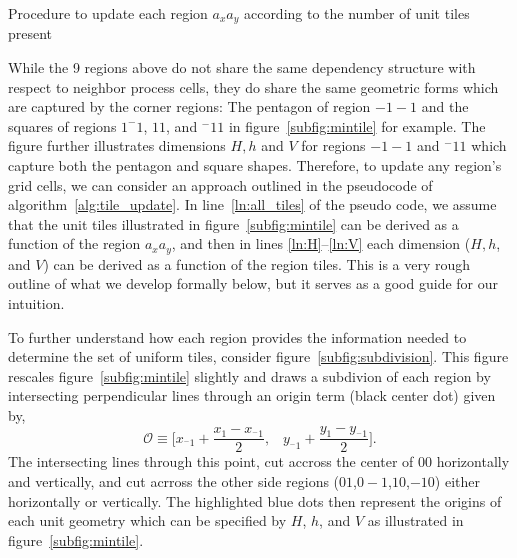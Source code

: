 \begin{algorithm}[h]
  \setcounter{AlgoLine}{0}
  \caption{Procedure to update each region $a_xa_y$ according to the number of unit tiles present}
  \label{alg:tile_update}
\end{algorithm}


While the 9 regions above do not share the same dependency structure with respect to neighbor process cells,
they do share the same geometric forms which are captured by the corner regions: The pentagon of region
$-1-1$ and the squares of regions $1^-1$, $11$, and $^-11$ in figure~\ref{subfig:mintile} for example.
  The figure further illustrates dimensions
$H,h$ and $V$ for regions $-1-1$ and $^-11$ which capture both the pentagon and square shapes.
Therefore, to update any
region's grid cells, we can consider an approach outlined in the pseudocode
of algorithm~\ref{alg:tile_update}.
  In line~\ref{ln:all_tiles} of the pseudo code, we assume that the unit tiles
 illustrated in figure~\ref{subfig:mintile} can be derived as a function of
 the region $a_xa_y$, and then in lines \ref{ln:H}--\ref{ln:V} each dimension
 ($H,h$, and $V$) can
 be derived as a function of the region tiles.  This is a
 very rough outline of
 what we develop formally below, but it serves as a good guide for our
 intuition.

To further understand how each region provides the information needed to
determine the set of uniform tiles, consider figure~\ref{subfig:subdivision}.
This figure rescales figure~\ref{subfig:mintile} slightly and draws
a subdivion of each region
by intersecting perpendicular lines through an origin term (black center dot)
given by,
\begin{equation}
  \mathcal{O} \equiv \bigl[x_{^-1} + \frac{x_1 - x_{^-1}}{2}, \;\;\; y_{^-1} + \frac{y_1 - y_{^-1}}{2} \bigl].
  \label{eq:O}
\end{equation}
The intersecting lines through this point, cut accross the center of $00$ horizontally and vertically,
and cut acrross the other side regions
($01$,$0-1$,$10$,$-10$) either horizontally or vertically.  The highlighted blue dots then represent the
origins of each unit geometry which can be specified by $H$, $h$, and $V$ as illustrated
in figure~\ref{subfig:mintile}.

